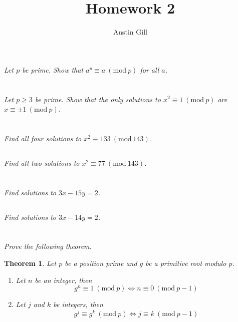 \documentclass[12pt]{article}
\title{Homework 2}
\author{Austin Gill}
\renewcommand{\mod}[1]{\mathrm{mod}\ #1}
\renewcommand{\pmod}[1]{\ (\mod{#1})}
\newtheorem*{thm}{Theorem}
\begin{document}
\maketitle

\section{} \textit{Let $p$ be prime. Show that $a^p \equiv a \pmod{p}$ for all $a$.}
\section{} \textit{Let $p \geq 3$ be prime. Show that the only solutions to $x^2 \equiv 1 \pmod{p}$ are $x \equiv \pm 1 \pmod{p}$.}
\section{}
    \subsection{} \textit{Find all four solutions to $x^2 \equiv 133 \pmod{143}$.}
    \subsection{} \textit{Find all two solutions to $x^2 \equiv 77 \pmod{143}$.}
\section{}
    \subsection{} \textit{Find solutions to $3x - 15y = 2$.}
    \subsection{} \textit{Find solutions to $3x - 14y = 2$.}
\section{} \textit{Prove the following theorem.}
    \begin{thm}
        Let $p$ be a position prime and $g$ be a primitive root modulo $p$.
        \begin{enumerate}
            \item Let $n$ be an integer, then $$g^n \equiv 1 \pmod{p} \Longleftrightarrow n \equiv 0 \pmod{p - 1}$$
            \item Let $j$ and $k$ be integers, then $$g^j \equiv g^k \pmod{p} \Longleftrightarrow j \equiv k \pmod{p - 1}$$
        \end{enumerate}
    \end{thm}
\end{document}
